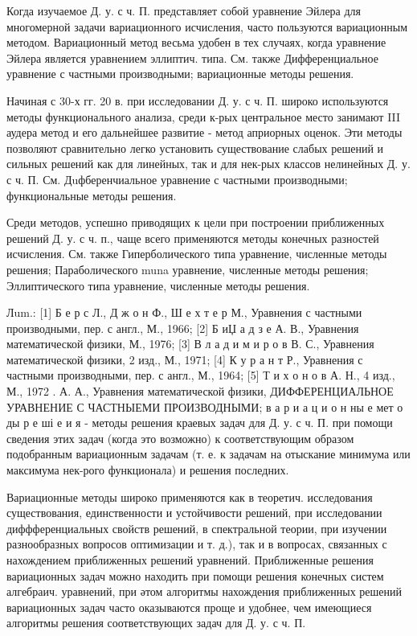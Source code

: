 \documentclass[10pt]{article}
\begin{document}
Когда изучаемое Д. у. с ч. П. представляет собой уравнение Эйлера для многомерной задачи вариационного исчисления, часто пользуются вариационным методом. Вариационный метод весьма удобен в тех случаях, когда уравнение Эйлера является уравнением эллиптич. типа. См. также Дифференциальное уравнение с частными производными; вариационные методы решения.



Начиная с 30-х гг. 20 в. при исследовании Д. у. с ч. П. широко используются методы функционального анализа, среди к-рых центральное место занимают III аудера метод и его дальнейшее развитие - метод априорных оценок. Эти методы позволяют сравнительно легко установить существование слабых решений и сильных решений как для линейных, так и для нек-рых классов нелинейных Д. у. с ч. П. См. Дuфберенчиальное уравнение с частными производными; функциональные методы решения.



Среди методов, успешно приводящих к цели при построении приближенных решений Д. у. с ч. п., чаще всего применяются методы конечных разностей исчисления. См. также Гиперболического типа уравнение, численные методы решения; Параболического muna уравнение, численные методы решения; Эллиптического типа уравнение, численные методы решения.



Лum.: [1] Б е р с Л., Д ж о н Ф., Ш е х т е р М., Уравнения с частными производными, пер. с англ., М., 1966; [2] Б иЏ а д з е А. В., Уравнения математической физики, М., 1976; [3] В л а д и м и р о в В. С., Уравнения математической физики, 2 изд., М., 1971; [4] К у р а н т Р., Уравнения с частными производными, пер. с англ., М., 1964; [5] Т и х о н о в А. Н., 4 изд., М., 1972 . А. А., Уравнения математической физики, ДИФФЕРЕНЦИАЛЬНОЕ УРАВНЕНИЕ С ЧАСТНЫЕМИ ПРОИЗВОДНЫМИ; в а р и а ц и о н ны е мет о ды р е ші е и я - методы решения краевых задач для Д. у. с ч. П. при помощи сведения этих задач (когда это возможно) к соответствующим образом подобранным вариационным задачам (т. е. к задачам на отыскание минимума или максимума нек-рого функционала) и решения последних.



Вариационные методы широко применяются как в теоретич. исследования существования, единственности и устойчивости решений, при исследовании диффференциальных свойств решений, в спектральной теории, при изучении разнообразных вопросов оптимизации и т. д.), так и в вопросах, связанных с нахождением приближенных решений уравнений. Приближенные решения вариационных задач можно находить при помощи решения конечных систем алгебраич. уравнений, при әтом алгоритмы нахождения приближенных решений вариационных задач часто оказываются проще и удобнее, чем имеющиеся алгоритмы решения соответствующих задач для Д. у. с ч. П.
\end{document}
